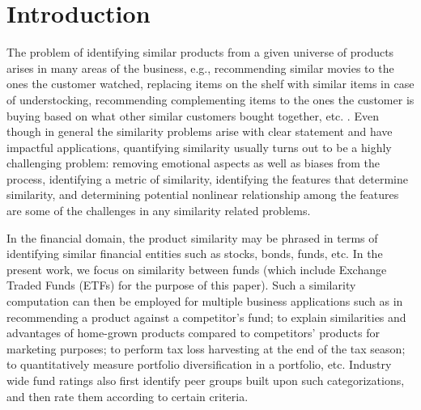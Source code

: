 \documentclass[sigconf]{acmart}
\begin{document}




\maketitle

\section{Introduction}
The problem of identifying similar products from a given universe of products arises in many areas of the business, e.g., recommending similar movies to the ones the customer watched, replacing items on the shelf with similar items in case of understocking, recommending complementing items to the ones the customer is buying based on what other similar customers bought together, etc. \cite{resnick1997recommender,aggarwal2016recommender}. Even though in general the similarity problems arise with clear statement and have impactful applications, quantifying similarity usually turns out to be a highly challenging problem: removing emotional aspects as well as biases from the process, identifying a metric of similarity, identifying the features that determine similarity, and determining potential nonlinear relationship among the features are some of the challenges in any similarity related problems. 

In the financial domain, the product similarity may be phrased in terms of identifying similar financial entities such as stocks, bonds, funds, etc. In the present work, we focus on similarity between funds (which include Exchange Traded Funds (ETFs) for the purpose of this paper). Such a similarity computation can then be employed for multiple business applications such as in recommending a product against a competitor's fund; to explain similarities and advantages of home-grown products compared to competitors' products for marketing purposes; to perform tax loss harvesting at the end of the tax season; to quantitatively measure portfolio diversification in a portfolio, etc. Industry wide fund ratings also first identify peer groups built upon such categorizations, and then rate them according to certain criteria. 
\end{document}
